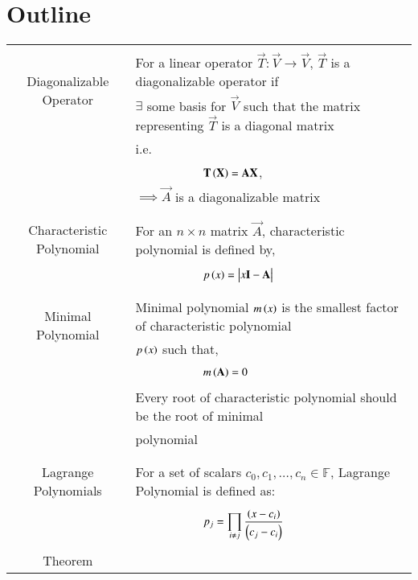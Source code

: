 \documentclass[journal,12pt]{IEEEtran}
\begin{document}
\section{\textbf{Outline}}
\renewcommand{\thetable}{1}
\begin{longtable}{|c|l|}
    \hline
    \multirow{3}{*}{Diagonalizable Operator} 
	& \\
	& For a linear operator $\vec{T}\colon \vec{V}\longrightarrow \vec{V}$, $\vec{T}$ is a diagonalizable operator if \\
	& $\exists$ some basis for $\Vec{V}$ such that the matrix representing $\vec{T}$ is a diagonal matrix\\
	&i.e.\\
	& $\qquad\qquad\qquad \vec{T}\brak{\vec{X}}=\Vec{A}\Vec{X}$,\\
    &$\implies \vec{A}$ is a diagonalizable matrix\\
	&\\
	\hline
	\multirow{3}{*}{Characteristic Polynomial} 
	& \\
	& For an $n\times n$ matrix $\vec{A}$, characteristic polynomial is defined by,\\
	&\\
	& $\qquad\qquad\qquad p\brak{x}=\mydet{x\Vec{I}-\Vec{A}}$\\
	&\\
	\hline
	\multirow{3}{*}{Minimal Polynomial} 
	&\\
	& Minimal polynomial $m\left(x\right)$ is the smallest factor of characteristic polynomial\\
	& $p\left(x\right)$ such that,\\
	&\\
	& $\qquad \qquad \qquad m\left(\mathbf{A}\right)=0$\\
	& \\
	& Every root of characteristic polynomial should be the root of minimal\\
	& polynomial\\
	&\\
    \hline
	\multirow{3}{*}{Lagrange Polynomials} 
	& \\
	& For a set of scalars $c_0, c_1,\dots, c_n \in \mathbb{F}$, Lagrange Polynomial is defined as:\\
	&\\
	&$\qquad\qquad\qquad p_j=\displaystyle\prod_{i\neq j}\frac{\left(x-c_i\right)}{\left(c_j-c_i\right)}$\\
	&\\
	\hline
	\multirow{3}{*}{Theorem} 
	& \\

\end{longtable}
\end{document}
